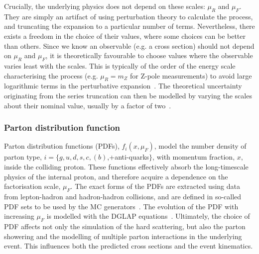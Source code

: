 Crucially, the underlying physics does not depend on these scales: $\mu_R$ and $\mu_F$. They are simply an artifact of using perturbation theory to calculate the process, and truncating the expansion to a particular number of terms. Nevertheless, there exists a freedom in the choice of their values, where some choices can be better than others. Since we know an observable (e.g. a cross section) should not depend on $\mu_R$ and $\mu_F$, it is theoretically favourable to choose values where the observable varies least with the scales. This is typically of the order of the energy scale characterising the process (e.g. $\mu_R = m_Z$ for Z-pole measurements) to avoid large logarithmic terms in the perturbative expansion~\cite{Buckley:2011ms}. The theoretical uncertainty originating from the series truncation can then be modelled by varying the scales about their nominal value, usually by a factor of two~\cite{doi:10.1146_annurev.nucl.55.090704.151505}.

\subsubsection{Parton distribution function}
Parton distribution functions (PDFs), $f_{i}(x,\mu_F)$, model the number density of parton type, $i=\{g,u,d,s,c,(b)$,+anti-quarks$\}$, with momentum fraction, $x$, inside the colliding proton. These functions effectively absorb the long-timescale physics of the internal proton, and therefore acquire a dependence on the factorisation scale, $\mu_F$. The exact forms of the PDFs are extracted using data from lepton-hadron and hadron-hadron collisions, and are defined in so-called PDF sets to be used by the MC generators~\cite{Butterworth:2015oua}. The evolution of the PDF with increasing $\mu_F$ is modelled with the DGLAP equations~\cite{Gribov:1972ri,Dokshitzer:1977sg,Altarelli:1977zs}. Ultimately, the choice of PDF affects not only the simulation of the hard scattering, but also the parton showering and the modelling of multiple parton interactions in the underlying event. This influences both the predicted cross sections and the event kinematics.

